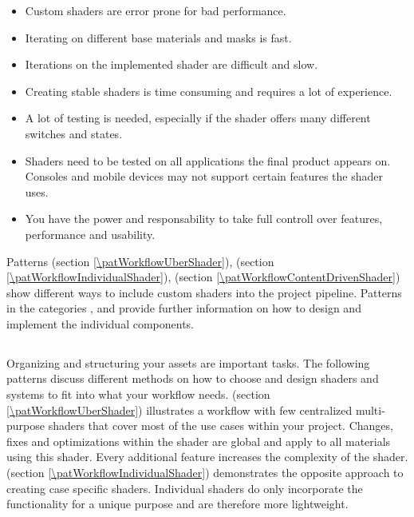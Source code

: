 \begin{description}
\begin{description}
\begin{itemize}
				\item Custom shaders are error prone for bad performance. 
			\end{itemize}
			\item[\pipeline:]\hfill
			\begin{itemize}\mynobreakpar
				\item Iterating on different base materials and masks is fast. 
				\item Iterations on the implemented shader are difficult and slow. 
				\item Creating stable shaders is time consuming and requires a lot of experience. 
				\item A lot of testing is needed, especially if the shader offers many different switches and states. 
				\item Shaders need to be tested on all applications the final product appears on. Consoles and mobile devices may not support certain features the shader uses. 
				\item You have the power and responsability to take full controll over features, performance and usability. 
			\end{itemize}
		\end{description}
	\item[\patRelations:]%
	Patterns \emph{\patWorkflowUberShader} (section \ref{\patWorkflowUberShader}), \emph{\patWorkflowIndividualShader} (section \ref{\patWorkflowIndividualShader}), \emph{\patWorkflowContentDrivenShader} (section \ref{\patWorkflowContentDrivenShader}) show different ways to include custom shaders into the project pipeline. Patterns in the categories \emph{\patCatMaterialContainer}, \emph{\patCatMaskingContainer} and \emph{\patCatBlendingModule} provide further information on how to design and implement the individual components.
\end{description}




\subsection{\patCatWorkflow}\label{\patCatWorkflow}

Organizing and structuring your assets are important tasks. The following patterns discuss different methods on how to  choose and design shaders and systems to fit into what your workflow needs. \emph{\patWorkflowUberShader} (section \ref{\patWorkflowUberShader}) illustrates a workflow with few centralized multi-purpose shaders that cover most of the use cases within your project. Changes, fixes and optimizations within the shader are global and apply to all materials using this shader. Every additional feature increases the complexity of the shader. \emph{\patWorkflowIndividualShader} (section \ref{\patWorkflowIndividualShader}) demonstrates the opposite approach to creating case specific shaders. Individual shaders do only incorporate the functionality for a unique purpose and are therefore more lightweight. 

